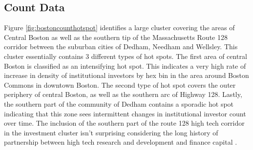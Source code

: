 \subsection{Count Data}

Figure \ref{fig:bostoncounthotspot} identifies a large cluster covering the areas of Central Boston as well as the southern tip of the Massachusetts Route 128 corridor between the suburban cities of Dedham, Needham and Wellsley.  This cluster essentially contains 3 different types of hot spots.  The first area of central Boston is classified as an intensifying hot spot. This indicates a very high rate of increase in density of institutional investors by hex bin in the area around Boston Commons in downtown Boston.  The second type of hot spot covers the outer periphery of central Boston, as well as the southern arc of Highway 128.  Lastly, the southern part of the community of Dedham contains a sporadic hot spot indicating that this zone sees intermittent changes in institutional investor count over time.  The inclusion of the southern part of the route 128 high tech corridor in the investment cluster isn't surprising considering the long history of partnership between high tech research and development and finance capital \citep{kenney1999technology}.  

